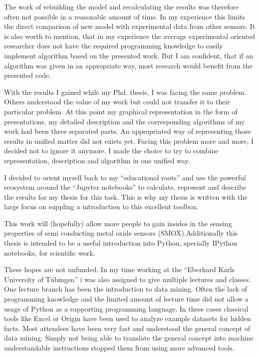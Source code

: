 \documentclass[11pt]{article}
\begin{document}
The work of rebuilding the model and recalculating the results was
therefore often not possible in a reasonable amount of time. In my
experience this limits the direct comparison of new model with
experimental data from other sensors. It is also worth to mention, that
in my experience the average experimental oriented researcher does not
have the required programming knowledge to easily implement algorithm
based on the presented work. But I am confident, that if an algorithm
was given in an appropriate way, most research would benefit from the
presented code.

With the results I gained while my Phd. thesis, I was facing the same
problem. Others understood the value of my work but could not transfer
it to their particular problem. At this point my graphical
representation in the form of presentations, my detailed description and
the corresponding algorithms of my work had been three separated parts.
An appropriated way of representing those results in unified matter did
not exists yet. Facing this problem more and more, I decided not to
ignore it anymore. I made the choice to try to combine representation,
description and algorithm in one unified way.

I decided to orient myself back to my ``educational roots'' and use the
powerful ecosystem around the ``Jupyter notebooks'' to calculate,
represent and describe the results for my thesis for this task. This is
why my thesis is written with the large focus on suppling a introduction
to this excellent toolbox.

This work will (hopefully) allow more people to gain insides in the
sensing properties of semi conducting metal oxide sensors
(SMOX).Additionally this thesis is intended to be a useful introduction
into Python, specially IPython notebooks, for scientific work.

These hopes are not unfunded. In my time working at the ``Eberhard Karls
University of Tübingen'' i was also assigned to give multiple lectures
and classes. One lecture branch has been the introduction to data
mining. Often the lack of programming knowledge and the limited amount
of lecture time did not allow a usage of Python as a supporting
programming language. In these cases classical tools like Excel or
Origin have been used to analyze example datasets for hidden facts. Most
attendees have been very fast and understood the general concept of data
mining. Simply not being able to translate the general concept into
machine understandable instructions stopped them from using more
advanced tools.
\end{document}
